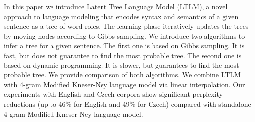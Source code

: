 In this paper we introduce Latent Tree Language Model (LTLM), a novel approach to language modeling that encodes syntax and semantics of a given sentence as a tree of word roles. The learning phase iteratively updates the trees by moving nodes according to Gibbs sampling. We introduce two algorithms to infer a tree for a given sentence. The first one is based on Gibbs sampling. It is fast, but does not guarantee to find the most probable tree. The second one is based on dynamic programming. It is slower, but guarantees to find the most probable tree. We provide comparison of both algorithms. We combine LTLM with 4-gram Modified Kneser-Ney language model via linear interpolation. Our experiments with English and Czech corpora show significant perplexity reductions (up to 46\% for English and 49\% for Czech) compared with standalone 4-gram Modified Kneser-Ney language model.
